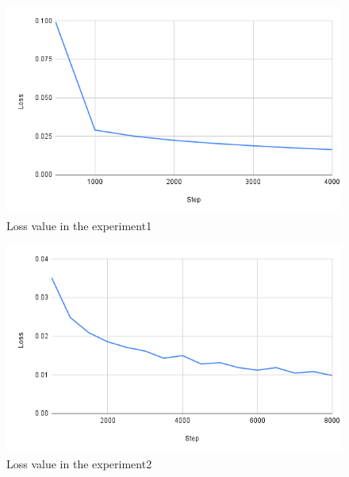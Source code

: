 
  
\newpage
\begin{figure}[h]
  \centering
  \includegraphics[keepaspectratio, scale=0.5]{images/exp3_4000.png}
  \caption{Loss value in the experiment1}
  \label{Fig:exp2.2-4000}
  \end{figure}

\begin{figure}[h]
  \centering
  \includegraphics[keepaspectratio, scale=0.5]{images/exp3_8000.png}
  \caption{Loss value in the experiment2}
  \label{Fig:exp2.2-8000}
  \end{figure}

